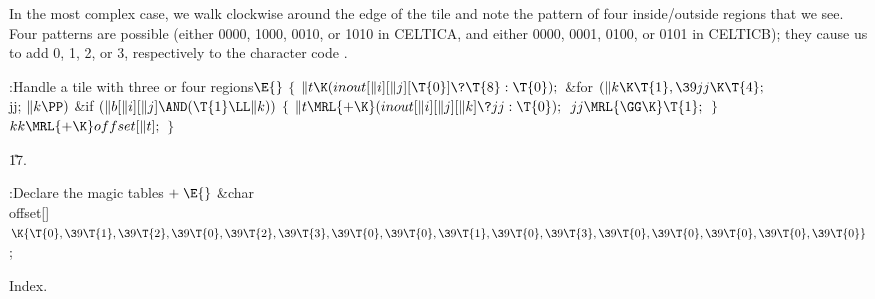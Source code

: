 In the most complex case, we walk clockwise around
the edge of the tile and
note the pattern of four inside/outside regions that we see. Four patterns
are possible (either 0000, 1000, 0010, or 1010 in {\mc CELTICA}, and
either 0000, 0001, 0100, or 0101 in {\mc CELTICB}); they cause us to
add 0, 1, 2, or 3, respectively to the character code .

\Y\B\4:Handle a tile with three or four regions\X${}\E{}$\6
${}\{{}$\1\6
${}\|t\K(\\{inout}[\|i][\|j][\T{0}]\?\T{8}:\T{0});{}$\6
\&{for} ${}(\|k\K\T{1},\39\\{jj}\K\T{4};{}$ \\{jj}; ${}\|k\PP){}$\1\6
\&{if} ${}(\|b[\|i][\|j]\AND(\T{1}\LL\|k)){}$\5
${}\{{}$\1\6
${}\|t\MRL{+{\K}}(\\{inout}[\|i][\|j][\|k]\?\\{jj}:\T{0});{}$\6
${}\\{jj}\MRL{{\GG}{\K}}\T{1};{}$\6
\4${}\}{}$\2\2\6
${}\\{kk}\MRL{+{\K}}\\{offset}[\|t];{}$\6
\4${}\}{}$\2\par
\U17.\fi

\B{}:Declare the magic tables\X${}\mathrel+\E{}$\6
\&{char} \\{offset}[]${}\K\{\T{0},\39\T{1},\39\T{2},\39\T{0},\39\T{2},\39%
\T{3},\39\T{0},\39\T{0},\39\T{1},\39\T{0},\39\T{3},\39\T{0},\39\T{0},\39\T{0},%
\39\T{0},\39\T{0}\}{}$;\par
\fi

Index.
\fi

\inx
\fin
\con
